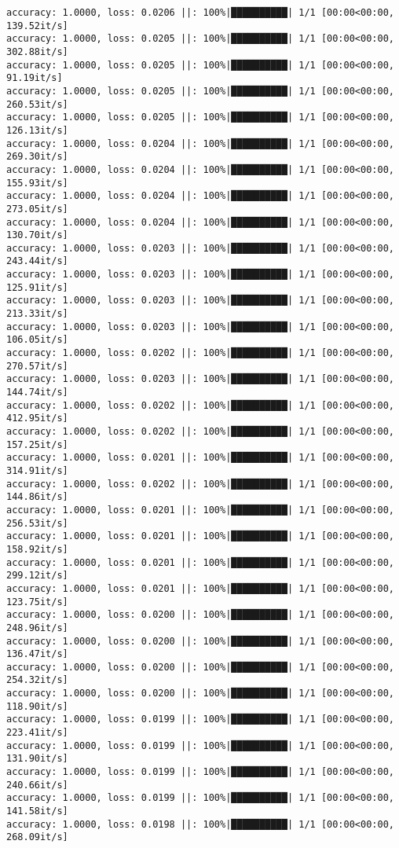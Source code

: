 \documentclass[
]{article}
\begin{document}
\begin{verbatim}
accuracy: 1.0000, loss: 0.0206 ||: 100%|██████████| 1/1 [00:00<00:00, 139.52it/s]
accuracy: 1.0000, loss: 0.0205 ||: 100%|██████████| 1/1 [00:00<00:00, 302.88it/s]
accuracy: 1.0000, loss: 0.0205 ||: 100%|██████████| 1/1 [00:00<00:00, 91.19it/s]
accuracy: 1.0000, loss: 0.0205 ||: 100%|██████████| 1/1 [00:00<00:00, 260.53it/s]
accuracy: 1.0000, loss: 0.0205 ||: 100%|██████████| 1/1 [00:00<00:00, 126.13it/s]
accuracy: 1.0000, loss: 0.0204 ||: 100%|██████████| 1/1 [00:00<00:00, 269.30it/s]
accuracy: 1.0000, loss: 0.0204 ||: 100%|██████████| 1/1 [00:00<00:00, 155.93it/s]
accuracy: 1.0000, loss: 0.0204 ||: 100%|██████████| 1/1 [00:00<00:00, 273.05it/s]
accuracy: 1.0000, loss: 0.0204 ||: 100%|██████████| 1/1 [00:00<00:00, 130.70it/s]
accuracy: 1.0000, loss: 0.0203 ||: 100%|██████████| 1/1 [00:00<00:00, 243.44it/s]
accuracy: 1.0000, loss: 0.0203 ||: 100%|██████████| 1/1 [00:00<00:00, 125.91it/s]
accuracy: 1.0000, loss: 0.0203 ||: 100%|██████████| 1/1 [00:00<00:00, 213.33it/s]
accuracy: 1.0000, loss: 0.0203 ||: 100%|██████████| 1/1 [00:00<00:00, 106.05it/s]
accuracy: 1.0000, loss: 0.0202 ||: 100%|██████████| 1/1 [00:00<00:00, 270.57it/s]
accuracy: 1.0000, loss: 0.0203 ||: 100%|██████████| 1/1 [00:00<00:00, 144.74it/s]
accuracy: 1.0000, loss: 0.0202 ||: 100%|██████████| 1/1 [00:00<00:00, 412.95it/s]
accuracy: 1.0000, loss: 0.0202 ||: 100%|██████████| 1/1 [00:00<00:00, 157.25it/s]
accuracy: 1.0000, loss: 0.0201 ||: 100%|██████████| 1/1 [00:00<00:00, 314.91it/s]
accuracy: 1.0000, loss: 0.0202 ||: 100%|██████████| 1/1 [00:00<00:00, 144.86it/s]
accuracy: 1.0000, loss: 0.0201 ||: 100%|██████████| 1/1 [00:00<00:00, 256.53it/s]
accuracy: 1.0000, loss: 0.0201 ||: 100%|██████████| 1/1 [00:00<00:00, 158.92it/s]
accuracy: 1.0000, loss: 0.0201 ||: 100%|██████████| 1/1 [00:00<00:00, 299.12it/s]
accuracy: 1.0000, loss: 0.0201 ||: 100%|██████████| 1/1 [00:00<00:00, 123.75it/s]
accuracy: 1.0000, loss: 0.0200 ||: 100%|██████████| 1/1 [00:00<00:00, 248.96it/s]
accuracy: 1.0000, loss: 0.0200 ||: 100%|██████████| 1/1 [00:00<00:00, 136.47it/s]
accuracy: 1.0000, loss: 0.0200 ||: 100%|██████████| 1/1 [00:00<00:00, 254.32it/s]
accuracy: 1.0000, loss: 0.0200 ||: 100%|██████████| 1/1 [00:00<00:00, 118.90it/s]
accuracy: 1.0000, loss: 0.0199 ||: 100%|██████████| 1/1 [00:00<00:00, 223.41it/s]
accuracy: 1.0000, loss: 0.0199 ||: 100%|██████████| 1/1 [00:00<00:00, 131.90it/s]
accuracy: 1.0000, loss: 0.0199 ||: 100%|██████████| 1/1 [00:00<00:00, 240.66it/s]
accuracy: 1.0000, loss: 0.0199 ||: 100%|██████████| 1/1 [00:00<00:00, 141.58it/s]
accuracy: 1.0000, loss: 0.0198 ||: 100%|██████████| 1/1 [00:00<00:00, 268.09it/s]

\end{verbatim}
\end{document}

